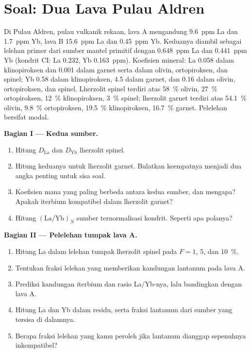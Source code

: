 \section{Soal: Dua Lava Pulau Aldren}

\begin{problem}\label{pb:b3:trace-element-modelling:1}
Di Pulau Aldren, pulau vulkanik rekaan, lava A mengandung \qty{9.6}{ppm} La
dan \qty{1.7}{ppm} Yb, lava B \qty{15.6}{ppm} La dan \qty{0.45}{ppm} Yb.
Keduanya diambil sebagai lelehan primer dari sumber mantel primitif dengan
\qty{0.648}{ppm} La dan \qty{0.441}{ppm} Yb (kondrit CI: La 0.232, Yb
\qty{0.163}{ppm}). Koefisien mineral: La 0.058 dalam klinopiroksen dan 0.001
dalam garnet serta dalam olivin, ortopiroksen, dan spinel; Yb 0.58 dalam
klinopiroksen, 4.5 dalam garnet, dan 0.16 dalam olivin, ortopiroksen, dan spinel.
Lherzolit spinel terdiri atas \qty{58}{\percent} olivin, \qty{27}{\percent} ortopiroksen, \qty{12}{\percent}
klinopiroksen, \qty{3}{\percent} spinel; lherzolit garnet terdiri atas \qty{54.1}{\percent} olivin, \qty{9.8}{\percent}
ortopiroksen, \qty{19.5}{\percent} klinopiroksen, \qty{16.7}{\percent} garnet. Pelelehan bersifat modal.

\medskip\noindent\textbf{Bagian I --- Kedua sumber.}
\begin{enumerate}
\item Hitung $D_{\mathrm{La}}$ dan $D_{\mathrm{Yb}}$ lherzolit spinel.
\item Hitung keduanya untuk lherzolit garnet. Bulatkan keempatnya menjadi dua
angka penting untuk sisa soal.
\item Koefisien mana yang paling berbeda antara kedua sumber, dan mengapa?
Apakah iterbium kompatibel dalam lherzolit garnet?
\item Hitung $(\mathrm{La}/\mathrm{Yb})_N$ sumber ternormalisasi kondrit.
Seperti apa polanya?
\end{enumerate}

\medskip\noindent\textbf{Bagian II --- Pelelehan tumpak lava A.}
\begin{enumerate}[resume]
\item Hitung La dalam lelehan tumpak lherzolit spinel pada $F = 1$, 5, dan
\qty{10}{\percent}.
\item Tentukan fraksi lelehan yang memberikan kandungan lantanum pada lava A.
\item Prediksi kandungan iterbium dan rasio La/Yb-nya, lalu bandingkan dengan lava A.
\item Hitung La dan Yb dalam residu, serta fraksi lantanum dari sumber
yang tersisa di dalamnya.
\item Berapa fraksi lelehan yang kamu peroleh jika lantanum dianggap
sepenuhnya inkompatibel?
\end{enumerate}


\end{problem}
